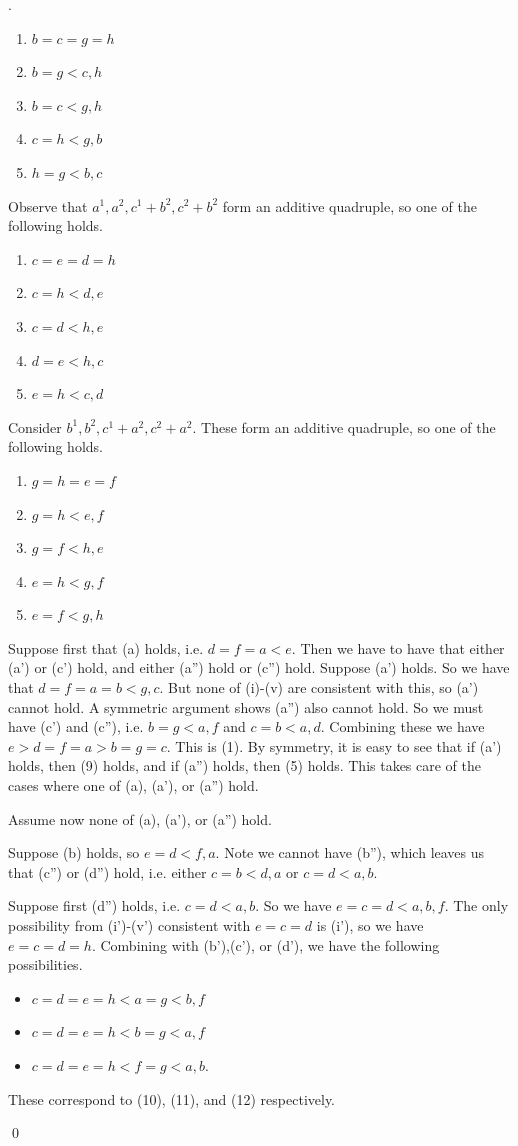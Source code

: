 \documentclass[12pt,oneside,british,a4wide]{amsart}
\numberwithin{equation}{section}
\theoremstyle{definition}
\newenvironment{proofof}[1]{\indent{\itshape Proof of #1}.\;}{\qed}
\begin{document}
\begin{proofof}{Lemma \ref{lem:2hop}}
\begin{enumerate}
\item $b=c=g=h$
\item $b=g<c,h$
\item $b=c<g,h$
\item $c=h<g,b$
\item $h=g<b,c$
 \end{enumerate}
Observe that $a^1,a^2,c^1+b^2,c^2+b^2$ form an additive quadruple, so one of the following holds.
\begin{enumerate}
\item[(i')] $c=e=d=h$
\item[(ii')] $c=h<d,e$
\item[(iii')] $c=d<h,e$
\item[(iv')] $d=e<h,c$
\item[(v')] $e=h<c,d$
\end{enumerate}
Consider $b^1,b^2,c^1+a^2,c^2+a^2$.  These form an additive quadruple, so one of the following holds.
\begin{enumerate}
\item[(i'')] $g=h=e=f$
\item[(ii'')] $g=h<e,f$
\item[(iii'')] $g=f<h,e$
\item[(iv'')] $e=h<g,f$
\item[(v'')] $e=f<g,h$
\end{enumerate}


Suppose first that (a) holds, i.e. $d=f=a<e$. Then we have to have that either (a') or (c') hold, and either (a'') hold or (c'') hold.  Suppose (a') holds.  So we have that $d=f=a=b<g,c$.  But none of (i)-(v) are consistent with this, so (a') cannot hold.  A symmetric argument shows (a'') also cannot hold.  So we must have (c') and (c''), i.e. $b=g<a,f$ and $c=b<a,d$.  Combining these we have $e>d=f=a>b=g=c$.  This is (1).  By symmetry, it is easy to see that if (a') holds, then (9) holds, and if (a'') holds, then (5) holds.   This takes care of the cases where one of (a), (a'), or (a'') hold.

Assume now none of (a), (a'), or (a'') hold. 

Suppose (b) holds, so $e=d<f,a$.  Note we cannot have (b''), which leaves us that (c'') or (d'') hold, i.e. either $c=b<d,a$ or $c=d<a,b$.  

Suppose first (d'') holds, i.e. $c=d<a,b$.  So we have $e=c=d<a,b,f$.  The only possibility from (i')-(v') consistent with $e=c=d$ is (i'), so we have $e=c=d=h$.  Combining with (b'),(c'), or (d'), we have the following possibilities.
\begin{itemize}
\item $c=d=e=h<a=g<b,f$
\item $c=d=e=h<b=g<a,f$
\item $c=d=e=h<f=g<a,b$.
\end{itemize}
These correspond to (10), (11), and (12) respectively.


\end{proofof}
\end{document}
